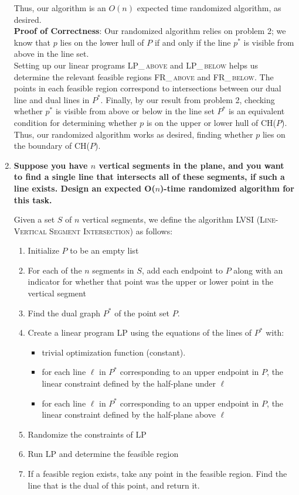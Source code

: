 \documentclass[11pt]{article}
\begin{document}
\begin{enumerate}
Thus, our algorithm is an $O(n)$ expected time randomized algorithm, as desired. \\

\textbf{Proof of Correctness}: Our randomized algorithm relies on problem 2; we know that $p$ lies on the lower hull of $P$ if and only if the line $p^*$ is visible from above in the line set. \\

Setting up our linear programs \textsc{LP\_\,above} and \textsc{LP\_\,below} helps us determine the relevant feasible regions \textsc{FR\_\,above} and \textsc{FR\_\,below}. The points in each feasible region correspond to intersections between our dual line and dual lines in $P^*$. Finally, by our result from problem 2, checking whether $p^*$ is visible from above or below in the line set $P^*$ is an equivalent condition for determining whether $p$ is on the upper or lower hull of CH($P$). \\

Thus, our randomized algorithm works as desired, finding whether $p$ lies on the boundary of CH($P$).


\newpage

\item\textbf{Suppose you have $n$ vertical segments in the plane, and you want to find a single line that intersects all of these segments, if such a line exists. Design an expected O($n$)-time randomized algorithm for this task.}

Given a set $S$ of $n$ vertical segments, we define the algorithm \textsc{LVSI} (\textsc{Line-Vertical Segment Intersection}) as follows:
\begin{enumerate}
    \item Initialize $P$ to be an empty list
    \item For each of the $n$ segments in $S$, add each endpoint to $P$ along with an indicator for whether that point was the upper or lower point in the vertical segment
    \item Find the dual graph $P^*$ of the point set $P$.
    \item Create a linear program \textsc{LP} using the equations of the lines of $P^*$ with:
        \begin{itemize}
        \item trivial optimization function (constant).
        \item for each line $\ell$ in $P^*$ corresponding to an upper endpoint in $P$, the linear constraint defined by the half-plane under $\ell$  \item for each line $\ell$ in $P^*$ corresponding to an upper endpoint in $P$, the linear constraint defined by the half-plane above $\ell$  
        \end{itemize}
    \item Randomize the constraints of LP
    \item Run LP and determine the feasible region
    \item If a feasible region exists, take any point in the feasible region. Find the line that is the dual of this point, and return it.
\end{enumerate}


\end{enumerate}
\end{document}
